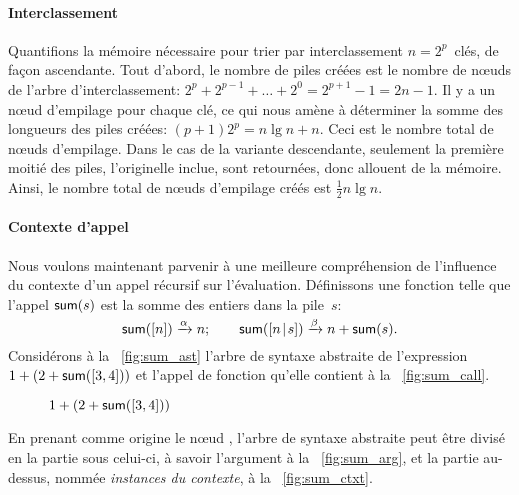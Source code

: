 \paragraph{Interclassement}

Quantifions la mémoire nécessaire pour trier par interclassement
\(n=2^p\)~clés, de façon ascendante. Tout d'abord, le nombre de piles
créées est le nombre de n{\oe}uds de l'arbre d'interclassement: \(2^p
+ 2^{p-1} + \ldots + 2^0 = 2^{p+1}-1 = 2n - 1\). Il y a un n{\oe}ud
d'empilage pour chaque clé, ce qui nous
amène à déterminer la somme des longueurs des piles créées: \((p+1)2^p
= n\lg n + n\). Ceci est le nombre total de n{\oe}uds d'empilage. Dans
le cas de la variante descendante, seulement la première moitié des
piles, l'originelle inclue, sont retournées, donc allouent de la
mémoire. Ainsi, le nombre total de n{\oe}uds d'empilage créés est
\(\tfrac{1}{2}n\lg n\).


\paragraph{Contexte d'appel}

Nous voulons maintenant parvenir à une meilleure compréhension de
l'influence du contexte d'un appel récursif sur
l'évaluation. Définissons une fonction  telle que l'appel
\(\textsf{sum}(s)\) est la somme des entiers dans la pile~\(s\):
\begin{equation*}
\textsf{sum}([n]) \xrightarrow{\smash{\alpha}} n;\qquad
\textsf{sum}([{n}\!\mid\!{s}]) \xrightarrow{\smash{\beta}} n + \textsf{sum}(s).
\end{equation*}
Considérons à la \fig~\vref{fig:sum_ast} l'arbre de syntaxe abstraite
de l'expression \(1+(2+\textsf{sum}([3,4]))\) et l'appel de fonction
qu'elle contient à la \fig~\ref{fig:sum_call}.
\begin{figure}
\centering
{}
\qquad
{}
\quad
{}
\qquad
{}
\caption{\(1+(2+\textsf{sum}([3,4]))\)}
\end{figure}
En prenant comme origine le n{\oe}ud , l'arbre de syntaxe
abstraite peut être divisé en la partie sous celui-ci, à savoir
l'argument à la \fig~\ref{fig:sum_arg}, et la partie au-dessus, nommée
\emph{instances du contexte}, à la \fig~\ref{fig:sum_ctxt}.

